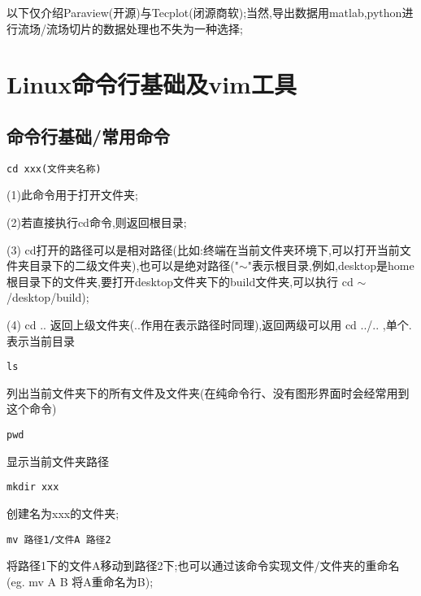 以下仅介绍Paraview(开源)与Tecplot(闭源商软);当然,导出数据用matlab,python进行流场/流场切片的数据处理也不失为一种选择;

\section{Linux命令行基础及vim工具}

\subsection{命令行基础/常用命令}

\begin{lstlisting}[frame=single]
cd xxx(文件夹名称)
\end{lstlisting}
\par
	(1)此命令用于打开文件夹;\par
	(2)若直接执行cd命令,则返回根目录;\par
	(3) cd打开的路径可以是相对路径(比如:终端在当前文件夹环境下,可以打开当前文件夹目录下的二级文件夹),也可以是绝对路径("$\sim$"表示根目录,例如,desktop是home根目录下的文件夹,要打开desktop文件夹下的build文件夹,可以执行 cd $\sim$/desktop/build);\par
	(4) cd .. 返回上级文件夹(..作用在表示路径时同理),返回两级可以用 cd ../.. ,单个.表示当前目录\par

\begin{lstlisting}[frame=single]
ls
\end{lstlisting}
\par
	列出当前文件夹下的所有文件及文件夹(在纯命令行、没有图形界面时会经常用到这个命令)\par

\begin{lstlisting}[frame=single]
pwd
\end{lstlisting}
\par
显示当前文件夹路径\par

\begin{lstlisting}[frame=single]
mkdir xxx
\end{lstlisting}
\par
	创建名为xxx的文件夹;\par

\begin{lstlisting}[frame=single]
mv 路径1/文件A 路径2
\end{lstlisting}
\par
将路径1下的文件A移动到路径2下;也可以通过该命令实现文件/文件夹的重命名(eg. mv A B 将A重命名为B);\par

